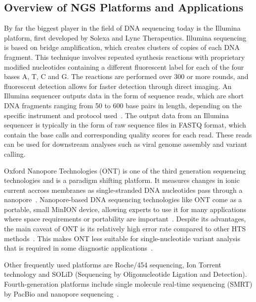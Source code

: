 \subsection{Overview of NGS Platforms and Applications}
By far the biggest player in the field of DNA sequencing today is the Illumina platform, first developed by Solexa and Lync Therapeutics. Illumina sequencing is based on bridge amplification, which creates clusters of copies of each DNA fragment. This technique involves repeated synthesis reactions with proprietary modified nucleotides containing a different fluorescent label for each of the four bases A, T, C and G. The reactions are performed over 300 or more rounds, and fluorescent detection allows for faster detection through direct imaging. An Illumina sequencer outputs data in the form of sequence reads, which are short DNA fragments ranging from 50 to 600 base pairs in length, depending on the specific instrument and protocol used~\cite{illumina2015introduction, slatko2018overview, mardis2008next}. The output data from an Illumina sequencer is typically in the form of raw sequence files in FASTQ format, which contain the base calls and corresponding quality scores for each read. These reads can be used for downstream analyses such as viral genome assembly and variant calling.

Oxford Nanopore Technologies (ONT) is one of the third generation sequencing technologies and is a paradigm shifting platform. It measures changes in ionic current accross membranes as single-stranded DNA nucleotides pass through a nanopore~\cite{jain2016oxford}. Nanopore-based DNA sequencing technologies like ONT come as a portable, small MinION device, allowing experts to use it for many applications where space requirements or portability are important~\cite{greninger2015rapid, jain2016oxford}. Despite its advantages, the main caveat of ONT is its relatively high error rate compared to other HTS methods~\cite{fu2019comparative}. This makes ONT less suitable for single-nucleotide variant analysis that is required in some diagnostic applications~\cite{bowden2019sequencing, stefan2022comparison}.

Other frequently used platforms are Roche/454 sequencing, Ion Torrent technology and SOLiD (Sequencing by Oligonucleotide Ligation and Detection). Fourth-generation platforms include single molecule real-time sequencing (SMRT) by PacBio and nanopore sequencing~\cite{rhoads2015pacbio}. 

